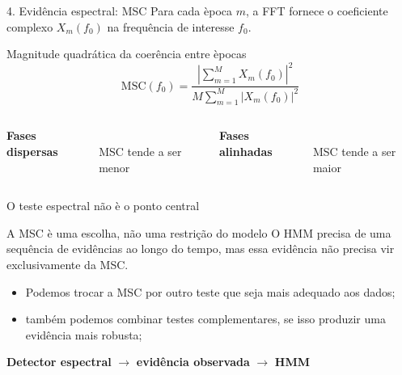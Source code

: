 \documentclass{beamer}
\begin{document}
\begin{frame}{4. Evid\^encia espectral: MSC}
\large
Para cada \`epoca $m$, a FFT fornece o coeficiente complexo $X_m(f_0)$ na
frequ\^encia de interesse $f_0$.

\begin{block}{Magnitude quadr\'atica da coer\^encia entre \`epocas}
\[
\mathrm{MSC}(f_0)=
\frac{\left|\displaystyle\sum_{m=1}^{M}X_m(f_0)\right|^2}
     {M\displaystyle\sum_{m=1}^{M}|X_m(f_0)|^2}
\]
\end{block}

\begin{columns}[T]
\centering
\textbf{Fases dispersas}\\[0.15cm]
\\[-0.1cm]
MSC tende a ser menor

\centering
\textbf{Fases alinhadas}\\[0.15cm]
\\[-0.1cm]
MSC tende a ser maior
\end{columns}

\end{frame}

\begin{frame}{O teste espectral n\~ao \`e o ponto central}
\large

\begin{block}{A MSC \`e uma escolha, n\~ao uma restri\c{c}\~ao do modelo}
O HMM precisa de uma sequ\^encia de evid\^encias ao longo do tempo, mas essa
evid\^encia n\~ao precisa vir exclusivamente da MSC.
\end{block}

\begin{itemize}
  \item Podemos trocar a MSC por outro teste que seja mais adequado aos dados;
  \item tamb\'em podemos combinar testes complementares, se isso produzir uma
  evid\^encia mais robusta;

\end{itemize}

\vfill
\centering
\textbf{Detector espectral} $\longrightarrow$ \textbf{evid\^encia observada}
$\longrightarrow$ \textbf{HMM}
\end{frame}
\end{document}
